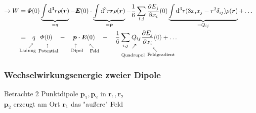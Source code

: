 \documentclass[titlepage,11pt,a4paper,ngerman]{report}
\newcommand{\tx}[1]{\textrm{#1}}
\newcommand{\dd}{\tx{d}}
\newcommand{\custo}[3]{\underset{\scriptstyle\overset{\mkern4mu\rotatebox{-90}{$\,#1$}}{#3}}{#2}}
\renewcommand{\Phi}{\varPhi}
\renewcommand{\vec}[1]{\boldsymbol{#1}}
\begin{document}
\begin{align*}
\rightarrow W &= \Phi(0)\underbrace{\int\dd^3r\rho(\vec{r})}_{=q}-\vec{E}(0)\cdot\underbrace{\int\dd^3r\vec{r}\rho(\vec{r})}_{=\vec{p}}-\frac{1}{6}\sum_{i,j}\frac{\partial E_j}{\partial x_i}(0)\underbrace{\int\dd^3r(3x_ix_j-r^2\delta_{ij})\rho(\vec{r})}_{=Q_{ij}}+\ldots \\
&= \custo{\substack{\vspace{10pt}\\ \nwarrow} }{q}{\mathclap{\tx{Ladung}}\qquad} \custo{\substack{\leftarrow}}{\Phi(0)}{\ \ \mathclap{\tx{Potential}}} \quad - \quad \custo{\substack{\leftarrow}}{\vec{p}}{\ \ \mathclap{\tx{Dipol}}} \cdot \custo{\substack{\swarrow\\ \vspace{5pt}}}{\vec{E}(0)}{\qquad \mathclap{\tx{Feld}}} \quad - \quad \frac{1}{6} \sum_{i,j} 
\custo{\substack{\vspace{7pt} \\ \nwarrow}}{Q_{ij}}{\mathclap{\substack{\\[5pt]\tx{Quadrupol}}} \quad} \custo{\substack{\swarrow \\ \vspace{5pt}}}{\frac{\partial E_j}{\partial x_i} (0)}{\qquad \quad \mathclap{\tx{Feldgradient}}} + \ldots
\end{align*}
\noindent
\begin{minipage}{.5\linewidth}
	
	\subsubsection{Wechselwirkungsenergie zweier Dipole}
	
	Betrachte 2 Punktdipole $\vec{p}_1,\vec{p}_2$ in $\vec{r}_1,\vec{r}_2$\\
	$\vec{p}_2$ erzeugt am Ort $\vec{r}_1$ das "au\ss ere" Feld
\end{minipage}
\begin{minipage}{.5\linewidth}
	\centering
	\vspace{10pt}
\end{minipage}
\end{document}
